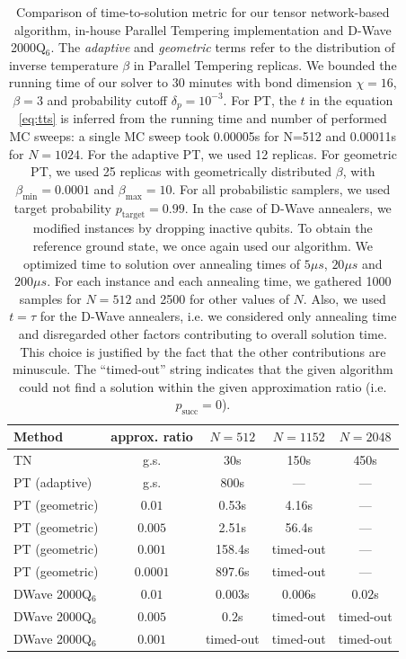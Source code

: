 \begin{table}[b]
  \centering
  \begin{tabular}{|l|c|ccc|}
    \hline
    \rowcolor{theader}  Method & approx. ratio & $N=512$   & $N=1152$  & $N=2048$  \\
    \hline
    TN                         & g.s.          & 30s       & 150s      & 450s      \\
    \hline
    \hline
    PT (adaptive)              & g.s.          & 800s      & ---       & ---       \\
    \hline
    PT (geometric)             & $0.01$        & 0.53s     & 4.16s     & ---       \\
    PT (geometric)             & $0.005$       & 2.51s     & 56.4s     & ---       \\
    PT (geometric)             & $0.001$       & 158.4s    & timed-out & ---       \\
    PT (geometric)             & $0.0001$      & 897.6s    & timed-out & ---       \\
    \hline
    \hline
    DWave 2000Q$_6$            & $0.01$        & $0.003$s  & $0.006$s  & $0.02$s   \\
    DWave 2000Q$_6$            & $0.005$       & $0.2$s    & timed-out & timed-out \\
    DWave 2000Q$_6$            & $0.001$       & timed-out & timed-out & timed-out \\
    \hline
    \hline
  \end{tabular}
  \caption{Comparison of time-to-solution metric for our tensor network-based algorithm,
    in-house Parallel Tempering implementation and D-Wave 2000Q$_{6}$. The
    \emph{adaptive} and \emph{geometric} terms refer to the distribution of inverse
    temperature $\beta$ in Parallel Tempering replicas. We bounded the running time
    of our solver to 30 minutes with bond dimension $\chi = 16$, $\beta=3$ and
    probability cutoff $\delta_{p} = 10^{-3}$. For PT, the $t$ in the equation
    \ref{eq:tts} is inferred from the running time and number of performed MC
    sweeps: a single MC sweep took 0.00005s for N=512 and 0.00011s for $N=1024$.
    For the adaptive PT, we used 12 replicas. For geometric PT, we used 25 replicas
    with geometrically distributed $\beta$, with $\beta_{\min}=0.0001$ and
    $\beta_{\max}=10$. For all probabilistic samplers, we used target probability
    $p_{\mbox{target}}=0.99$. In the case of D-Wave annealers, we modified
    instances by dropping inactive qubits. To obtain the reference ground state, we
    once again used our algorithm. We optimized time to solution over annealing
    times of $5\mu s$, $20\mu s$ and $200\mu s$. For each instance and each
    annealing time, we gathered 1000 samples for $N=512$ and 2500 for other values
    of $N$. Also, we used $t=\tau$ for the D-Wave annealers, i.e. we considered
    only annealing time and disregarded other factors contributing to overall
    solution time. This choice is justified by the fact that the other
    contributions are minuscule. The ``timed-out'' string indicates that the given
    algorithm could not find a solution within the given approximation ratio (i.e.
    $p_{\mbox{succ}}=0$). } \label{tab:tnvspt}
\end{table}

